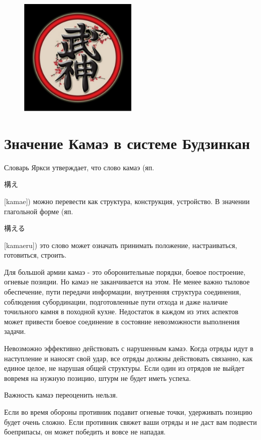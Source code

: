 \documentclass[russian,]{article}
\begin{document}
\begin{figure}
	\centering
	\includegraphics[width=0.5\textwidth]{x_5711c012.eps}
\end{figure}

{
	\centering
	\section*{Значение Камаэ в системе Будзинкан}
}

Словарь Яркси утверждает, что слово камаэ (яп. \begin{CJK}{UTF8}{min}構え\end{CJK} [kamae]) можно перевести как структура, конструкция, устройство. В значении глагольной форме (яп. \begin{CJK}{UTF8}{min}構える\end{CJK} [kamaeru]) это слово может означать принимать положение, настраиваться, готовиться, строить.

Для большой армии камаэ - это оборонительные порядки, боевое построение, огневые позиции. Но камаэ не заканчивается на этом. Не менее важно тыловое обеспечение, пути передачи информации, внутренняя структура соединения, соблюдения субординации, подготовленные пути отхода и даже наличие точильного камня в походной кухне. Недостаток в каждом из этих аспектов может привести боевое соединение в состояние невозможности выполнения задачи.

Невозможно эффективно действовать с нарушенным камаэ. Когда отряды идут в наступление и наносят свой удар, все отряды должны действовать связанно, как единое целое, не нарушая общей структуры. Если один из отрядов не выйдет вовремя на нужную позицию, штурм не будет иметь успеха.

Важность камаэ переоценить нельзя.

Если во время обороны противник подавит огневые точки, удерживать позицию будет очень сложно. Если противник свяжет ваши отряды и не даст вам подвести боеприпасы, он может победить и вовсе не нападая.
\end{document}
